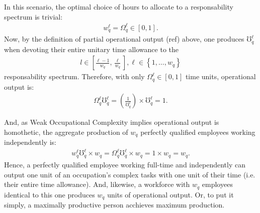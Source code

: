 \documentclass[hidelinks, nonatbib]{elsarticle}
\begin{document}
\begin{enumerate}
\begin{enumerate}
    In this scenario, the optimal choice of hours to allocate to a responsability spectrum is trivial:
    \begin{gather}
        w_{q}^{\ell}
        =
        \Omega_{q}^{\ell}
        \in [0,1]
        .
    \end{gather}
    Now, by the definition of partial operational output (ref) above, one produces $\mho_{q}^{\ell}$ when devoting their entire unitary time allowance to the
    \begin{gather}
        l \in \left[
        \frac{\ell - 1}{w_q}
        ,
        \frac{\ell}{w_q}
        \right]
        ,
        \ell \in 
        \left\{
            1, \dots, w_q
        \right\}
    \end{gather}
    responsability spectrum. Therefore, with only $\Omega_{q}^{\ell} \in [0,1]$ time units, operational output is:
    \begin{gather}
        \Omega_{q}^{\ell}
        \mho_{q}^{\ell}
        =
        \left(
            \frac{1}{\mho_{q}^{\ell}}
        \right)
        \times
        \mho_{q}^{\ell}
        =
        1
        .
    \end{gather}

    And, as Weak Occupational Complexity implies operational output is homothetic, the aggregate production of $w_q$ perfectly qualified employees working independently is:
    \begin{gather}
        w_{q}^{\ell}
        \mho_{q}^{\ell}
        \times
        w_q
        =
        \Omega_{q}^{\ell}
        \mho_{q}^{\ell}
        \times
        w_q
        =
        1
        \times
        w_q
        =
        w_q
        .
    \end{gather}
    Hence, a perfectly qualified employee working full-time and independently can output one unit of an occupation's complex tasks with one unit of their time (i.e. their entire time allowance). And, likewise, a workforce with $w_q$ employees identical to this one produces $w_q$ units of operational output. Or, to put it simply, a maximally productive person acchieves maximum production.
\end{enumerate}


\end{enumerate}
\end{document}
